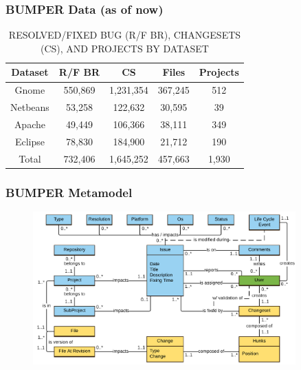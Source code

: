 \documentclass{beamer}
\begin{document}
\begin{frame}

  \frametitle{BUMPER Data (as of now)}

  \begin{table}[]
  \centering
  \caption{
  RESOLVED/FIXED BUG (R/F BR),  CHANGESETS (CS), AND
  PROJECTS BY DATASET}
  \label{tab:summary}
  \begin{tabular}{c|c|c|c|c}
  \textbf{Dataset} & \textbf{R/F BR} & \textbf{CS} & \textbf{Files} & \textbf{Projects} \\ \hline \hline
  Gnome            & 550,869         & 1,231,354   & 367,245        & 512                \\ \hline
  Netbeans         & 53,258          & 122,632     & 30,595         & 39                \\ \hline
  Apache           & 49,449          & 106,366     & 38,111         & 349               \\ \hline
  Eclipse          & 78,830          & 184,900     & 21,712         & 190                \\ \hline \hline
  Total            & 732,406         & 1,645,252   & 457,663        & 1,930               \\ \hline \hline
  \end{tabular}
  \vspace{-2em}
  \end{table}

\end{frame}

\begin{frame}

  \frametitle{BUMPER Metamodel}

  \begin{figure}
    \centering
    \includegraphics[width=0.9\textwidth]{../media/Bumper-Model.png}
  \vspace{-1.8em}
  \end{figure}

\end{frame}
\end{document}
